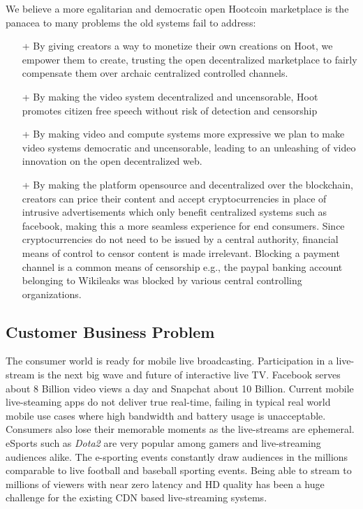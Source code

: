 \documentclass{article}
\begin{document}
We believe a more egalitarian and democratic open Hootcoin marketplace is the
panacea to many problems the old systems fail to address:
\begin{itemize}
\item[+]By giving creators a way to monetize their own creations on Hoot, we
empower them to create, trusting the open decentralized marketplace to fairly compensate
them over archaic centralized controlled channels.
\item[+]By making the video system decentralized and uncensorable, Hoot promotes citizen free speech without risk of detection and censorship
\item[+]By making video and compute systems more expressive we plan to make video systems democratic and uncensorable, leading to an unleashing of video innovation on the open decentralized web.
\item[+]By making the platform opensource and decentralized over the blockchain, creators can price their content and accept cryptocurrencies in place of intrusive advertisements which only benefit centralized systems such as facebook, making this a more seamless experience for end consumers. Since  cryptocurrencies do not need to be issued by a central authority, financial means of control to censor content is made irrelevant. Blocking a  payment channel is a common means of censorship e.g., the paypal banking account belonging to  Wikileaks was blocked by various central controlling organizations.
\end{itemize}


\subsection{Customer Business Problem}
The consumer world is ready for mobile live broadcasting. Participation in a live-stream is the next big wave and future of interactive live TV. Facebook serves about 8 Billion video views a day and Snapchat about 10 Billion. Current mobile live-steaming apps do not deliver true real-time, failing in typical real world mobile use cases where high bandwidth and battery usage is unacceptable. Consumers also lose their memorable moments as the live-streams are ephemeral. eSports such as \emph{Dota2} are very popular among gamers and live-streaming audiences alike. The e-sporting events constantly draw audiences in the millions comparable to live football and baseball sporting events. Being able to stream to millions of viewers with near zero latency and HD quality has been a huge challenge for the existing CDN based live-streaming systems.
\end{document}
